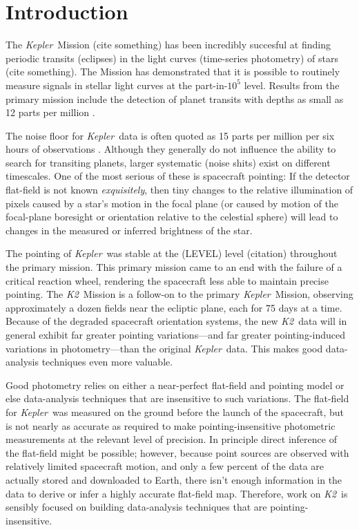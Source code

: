 \documentclass[12pt,preprint]{aastex}
\newcommand{\project}[1]{\textsl{#1}} %
\newcommand{\kepler}{\project{Kepler}}
\newcommand{\KT}{\project{K2}}
\begin{document}

\section{Introduction}

The \kepler\ Mission (cite something) has been incredibly succesful at
finding periodic transits (eclipses) in the light curves (time-series
photometry) of stars (cite something).
The Mission has demonstrated that it is possible to routinely measure
signals in stellar light curves at the part-in-$10^5$ level.
Results from the primary mission include the detection of planet
transits with depths as small as 12 parts per million \citep{Barclay:2013}.

The noise floor for \kepler\ data is often quoted as 15 parts per million per
six hours of observations \citep{Gilliland:2011}.
Although they generally do not influence the ability to search for transiting
planets, larger systematic (noise shits) exist on different timescales.
One of the most serious of these is spacecraft pointing:
If the detector flat-field is not known \emph{exquisitely}, then
tiny changes to the relative illumination of pixels caused by a star's
motion in the focal plane (or caused by motion of the focal-plane
boresight or orientation relative to the celestial sphere) will lead
to changes in the measured or inferred brightness of the star.

The pointing of \kepler\ was stable at the (LEVEL) level (citation) throughout
the primary mission.
This primary mission came to an end with the failure of a critical
reaction wheel, rendering the spacecraft less able to maintain precise
pointing.
The \KT\ Mission \citep{Howell:2014} is a follow-on to the primary
\kepler\ Mission, observing approximately a dozen fields near the ecliptic
plane, each for 75 days at a time.
Because of the degraded spacecraft orientation systems, the new
\KT\ data will in general exhibit far greater pointing
variations---and far greater pointing-induced variations in
photometry---than the original \kepler\ data.
This makes good data-analysis techniques even more valuable.

Good photometry relies on either a near-perfect flat-field
and pointing model or else data-analysis techniques that are
insensitive to such variations.
The flat-field for \kepler\ was measured on the ground before the launch of
the spacecraft, but is not nearly as accurate as required to make
pointing-insensitive photometric measurements at the relevant level of precision.
In principle direct inference of the flat-field might be possible;
however, because point sources are observed with relatively limited
spacecraft motion, and only a few percent of the data are actually stored and
downloaded to Earth, there isn't enough information in the data to derive or
infer a highly accurate flat-field map.
Therefore, work on \KT\ is sensibly focused on building data-analysis
techniques that are pointing-insensitive.
\end{document}
